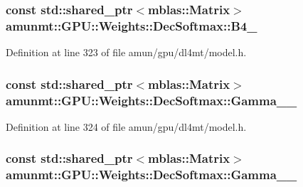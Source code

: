\subsubsection[{\texorpdfstring{B4\+\_\+}{B4_}}]{\setlength{\rightskip}{0pt plus 5cm}const std\+::shared\+\_\+ptr$<${\bf mblas\+::\+Matrix}$>$ amunmt\+::\+G\+P\+U\+::\+Weights\+::\+Dec\+Softmax\+::\+B4\+\_\+}\hypertarget{structamunmt_1_1GPU_1_1Weights_1_1DecSoftmax_af977c664f447f9be7e9e5012f150512a}{}\label{structamunmt_1_1GPU_1_1Weights_1_1DecSoftmax_af977c664f447f9be7e9e5012f150512a}


Definition at line 323 of file amun/gpu/dl4mt/model.\+h.

\subsubsection[{\texorpdfstring{Gamma\+\_\+0\+\_\+}{Gamma_0_}}]{\setlength{\rightskip}{0pt plus 5cm}const std\+::shared\+\_\+ptr$<${\bf mblas\+::\+Matrix}$>$ amunmt\+::\+G\+P\+U\+::\+Weights\+::\+Dec\+Softmax\+::\+Gamma\+\_\+\_\+}\hypertarget{structamunmt_1_1GPU_1_1Weights_1_1DecSoftmax_a63a49f9647e63f4025784073d7208119}{}\label{structamunmt_1_1GPU_1_1Weights_1_1DecSoftmax_a63a49f9647e63f4025784073d7208119}


Definition at line 324 of file amun/gpu/dl4mt/model.\+h.

\subsubsection[{\texorpdfstring{Gamma\+\_\+1\+\_\+}{Gamma_1_}}]{\setlength{\rightskip}{0pt plus 5cm}const std\+::shared\+\_\+ptr$<${\bf mblas\+::\+Matrix}$>$ amunmt\+::\+G\+P\+U\+::\+Weights\+::\+Dec\+Softmax\+::\+Gamma\+\_\+\_\+}\hypertarget{structamunmt_1_1GPU_1_1Weights_1_1DecSoftmax_aee6cd0c228c5a28670af55ece5a034f5}{}\label{structamunmt_1_1GPU_1_1Weights_1_1DecSoftmax_aee6cd0c228c5a28670af55ece5a034f5}


